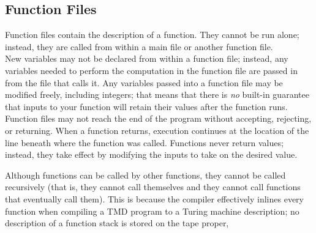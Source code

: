 \documentclass{report}
\begin{document}
\subsection{Function Files}

Function files contain the description of a function. They cannot be run alone; instead, they are called from within a main file or another function file. \\
  
New variables may not be declared from within a function file; instead, any variables needed to perform the computation in the function file are passed in from the file that calls it. Any variables passed into a function file may be modified freely, including integers; that means that there is \emph{no} built-in guarantee that inputs to your function will retain their values after the function runs. \\

Function files may not reach the end of the program without accepting, rejecting, or returning. When a function returns, execution continues at the location of the line beneath where the function was called. Functions never return values; instead, they take effect by modifying the inputs to take on the desired value.

Although functions can be called by other functions, they cannot be called recursively (that is, they cannot call themselves and they cannot call functions that eventually call them). This is because the compiler effectively inlines every function when compiling a TMD program to a Turing machine description; no description of a function stack is stored on the tape proper, 
\end{document}
